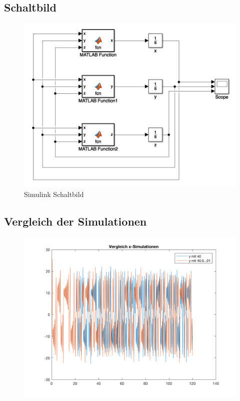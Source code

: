 \documentclass[]{scrartcl}
\begin{document}
\subsection{Schaltbild}
\begin{figure}[H]
	\centering
	\includegraphics[width=1\linewidth]{a1_3_schaltbild}
	\caption{Simulink Schaltbild}
	\label{fig:a1_3_schaltbild}
\end{figure}

\subsection{Vergleich der Simulationen}
\begin{figure}[H]
	\centering
	\includegraphics[width=1\linewidth]{a1_3_2}
	\caption{}
	\label{fig:a1_3_2}
\end{figure}
\end{document}
